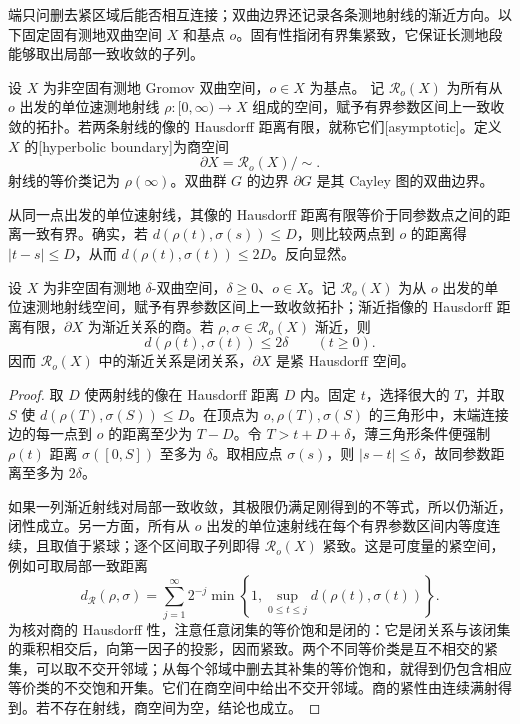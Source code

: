 端只问删去紧区域后能否相互连接；双曲边界还记录各条测地射线的渐近方向。以下固定固有测地双曲空间 \(X\) 和基点 \(o\)。固有性指闭有界集紧致，它保证长测地段能够取出局部一致收敛的子列。

\begin{definition}\label{g3:def:D-hyperbolic-boundary}
	设 \(X\) 为非空固有测地 Gromov 双曲空间，\(o\in X\) 为基点。
	记 \(\mathcal R_o(X)\) 为所有从 \(o\) 出发的单位速测地射线 \(\rho:[0,\infty)\rightarrow X\) 组成的空间，赋予有界参数区间上一致收敛的拓扑。若两条射线的像的 Hausdorff 距离有限，就称它们[asymptotic]。定义 \(X\) 的[hyperbolic boundary]为商空间
	\[
		\partial X=\mathcal R_o(X)/{\sim}.
	\]
	射线的等价类记为 \(\rho(\infty)\)。双曲群 \(G\) 的边界 \(\partial G\) 是其 Cayley 图的双曲边界。
\end{definition}

从同一点出发的单位速射线，其像的 Hausdorff 距离有限等价于同参数点之间的距离一致有界。确实，若 \(d(\rho(t),\sigma(s))\le D\)，则比较两点到 \(o\) 的距离得 \(|t-s|\le D\)，从而 \(d(\rho(t),\sigma(t))\le2D\)。反向显然。

\begin{lemma}\label{g3:lem:D-asymptotic-rays}
	设 \(X\) 为非空固有测地 \(\delta\)-双曲空间，\(\delta\ge0\)、\(o\in X\)。记 \(\mathcal R_o(X)\) 为从 \(o\) 出发的单位速测地射线空间，赋予有界参数区间上一致收敛拓扑；渐近指像的 Hausdorff 距离有限，\(\partial X\) 为渐近关系的商。若 \(\rho,\sigma\in\mathcal R_o(X)\) 渐近，则
	\[
		d(\rho(t),\sigma(t))\le2\delta\qquad(t\ge0).
	\]
	因而 \(\mathcal R_o(X)\) 中的渐近关系是闭关系，\(\partial X\) 是紧 Hausdorff 空间。
\end{lemma}
\begin{proof}
	取 \(D\) 使两射线的像在 Hausdorff 距离 \(D\) 内。固定 \(t\)，选择很大的 \(T\)，并取 \(S\) 使 \(d(\rho(T),\sigma(S))\le D\)。在顶点为 \(o,\rho(T),\sigma(S)\) 的三角形中，末端连接边的每一点到 \(o\) 的距离至少为 \(T-D\)。令 \(T>t+D+\delta\)，薄三角形条件便强制 \(\rho(t)\) 距离 \(\sigma([0,S])\) 至多为 \(\delta\)。取相应点 \(\sigma(s)\)，则 \(|s-t|\le\delta\)，故同参数距离至多为 \(2\delta\)。

	如果一列渐近射线对局部一致收敛，其极限仍满足刚得到的不等式，所以仍渐近，闭性成立。另一方面，所有从 \(o\) 出发的单位速射线在每个有界参数区间内等度连续，且取值于紧球；逐个区间取子列即得 \(\mathcal R_o(X)\) 紧致。这是可度量的紧空间，例如可取局部一致距离
	\[
		d_{\mathcal R}(\rho,\sigma)=\sum_{j=1}^{\infty}2^{-j}\min\left\{1,\sup_{0\le t\le j}d(\rho(t),\sigma(t))\right\}.
	\]
	为核对商的 Hausdorff 性，注意任意闭集的等价饱和是闭的：它是闭关系与该闭集的乘积相交后，向第一因子的投影，因而紧致。两个不同等价类是互不相交的紧集，可以取不交开邻域；从每个邻域中删去其补集的等价饱和，就得到仍包含相应等价类的不交饱和开集。它们在商空间中给出不交开邻域。商的紧性由连续满射得到。若不存在射线，商空间为空，结论也成立。
\end{proof}

